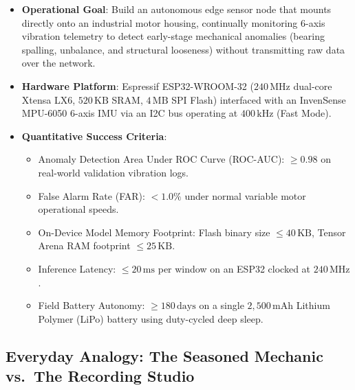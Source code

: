\begin{keyidea}
\begin{itemize}
    \item \textbf{Operational Goal}: Build an autonomous edge sensor node that mounts directly onto an industrial motor housing, continually monitoring 6-axis vibration telemetry to detect early-stage mechanical anomalies (bearing spalling, unbalance, and structural looseness) without transmitting raw data over the network.
    \item \textbf{Hardware Platform}: Espressif ESP32-WROOM-32 ($240\,\text{MHz}$ dual-core Xtensa LX6, $520\,\text{KB}$ SRAM, $4\,\text{MB}$ SPI Flash) interfaced with an InvenSense MPU-6050 6-axis IMU via an I2C bus operating at $400\,\text{kHz}$ (Fast Mode).
    \item \textbf{Quantitative Success Criteria}:
    \begin{itemize}
        \item Anomaly Detection Area Under ROC Curve (ROC-AUC): $\ge 0.98$ on real-world validation vibration logs.
        \item False Alarm Rate (FAR): $< 1.0\%$ under normal variable motor operational speeds.
        \item On-Device Model Memory Footprint: Flash binary size $\le 40\,\text{KB}$, Tensor Arena RAM footprint $\le 25\,\text{KB}$.
        \item Inference Latency: $\le 20\,\text{ms}$ per window on an ESP32 clocked at $240\,\text{MHz}$.
        \item Field Battery Autonomy: $\ge 180\,\text{days}$ on a single $2{,}500\,\text{mAh}$ Lithium Polymer (LiPo) battery using duty-cycled deep sleep.
    \end{itemize}
\end{itemize}
\end{keyidea}

\subsection{Everyday Analogy: The Seasoned Mechanic vs.\ The Recording Studio}\label{subsec:p3_analogy}

